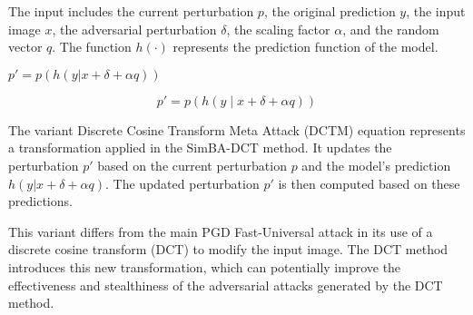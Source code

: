 The input includes the current perturbation $p$, the original prediction $y$, the input image $x$, the adversarial perturbation $\delta$, the scaling factor $\alpha$, and the random vector $q$. The function $h(\cdot)$ represents the prediction function of the model.

$p' = p(h(y | x + \delta + \alpha q))$

\begin{equation*}
p' = p \left( h \left( y \mid x + \delta + \alpha q \right) \right)
\end{equation*}

The variant Discrete Cosine Transform Meta Attack (DCTM) equation represents a transformation applied in the SimBA-DCT method. It updates the perturbation $p'$ based on the current perturbation $p$ and the model's prediction $h(y | x + \delta + \alpha q)$. The updated perturbation $p'$ is then computed based on these predictions.

This variant differs from the main PGD Fast-Universal attack in its use of a discrete cosine transform (DCT) to modify the input image. The DCT method introduces this new transformation, which can potentially improve the effectiveness and stealthiness of the adversarial attacks generated by the DCT method.